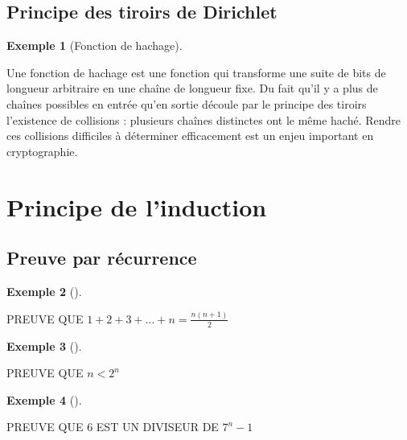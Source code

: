 \documentclass[
  letterpaper,
]{scrbook}
\theoremstyle{definition}
\newtheorem{example}{Exemple}[chapter]
\theoremstyle{definition}
\theoremstyle{plain}
\theoremstyle{remark}
\begin{document}
\hypertarget{principe-des-tiroirs-de-dirichlet}{%
\subsection{Principe des tiroirs de
Dirichlet}\label{principe-des-tiroirs-de-dirichlet}}

\leavevmode{}%
\begin{example}[Fonction de hachage]\label{exm-fonction-hachage}

Une fonction de hachage est une fonction qui transforme une suite de
bits de longueur arbitraire en une chaîne de longueur fixe. Du fait
qu'il y a plus de chaînes possibles en entrée qu'en sortie découle par
le principe des tiroirs l'existence de collisions : plusieurs chaînes
distinctes ont le même haché. Rendre ces collisions difficiles à
déterminer efficacement est un enjeu important en cryptographie.

\end{example}

\hypertarget{principe-de-linduction}{%
\section{Principe de l'induction}\label{principe-de-linduction}}

\hypertarget{preuve-par-ruxe9currence}{%
\subsection{Preuve par récurrence}\label{preuve-par-ruxe9currence}}

\leavevmode{}%
\begin{example}[]\label{exm-somme-n-premiers-entiers}

PREUVE QUE \(1+2+3+\ldots +n=\frac{n(n+1)}{2}\)

\end{example}

\leavevmode{}%
\begin{example}[]\label{exm-n-plus-petit-2n}

PREUVE QUE \(n<2^n\)

\end{example}

\leavevmode{}%
\begin{example}[]\label{exm-6-divise-7n-1}

PREUVE QUE 6 EST UN DIVISEUR DE \(7^n-1\)

\end{example}
\end{document}
